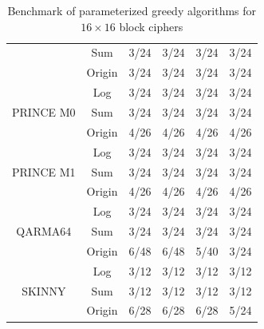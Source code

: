\begin{table}[H]
{\begin{tabular}{ c c c c c c }
             & Sum & 3/24 & 3/24 & 3/24 & 3/24 \\
             & Origin & 3/24 & 3/24 &  3/24 & 3/24 \\
             \hline
             \multirow{3}{4em}{PRINCE M0\cite{borghoff2012prince}} & Log &  3/24 & 3/24 & 3/24 & 3/24 \\
             & Sum & 3/24 & 3/24 & 3/24 & 3/24 \\
             & Origin & 4/26 & 4/26 & 4/26 & 4/26 \\
             \hline
             \multirow{3}{4em}{PRINCE M1\cite{borghoff2012prince}} & Log &  3/24 & 3/24 & 3/24 & 3/24 \\
             & Sum & 3/24 & 3/24 & 3/24 & 3/24 \\
             & Origin & 4/26 & 4/26 & 4/26 & 4/26 \\
            \hline
            \multirow{3}{4em}{QARMA64\cite{avanzi2017qarma}} & Log &  3/24 & 3/24 & 3/24 & 3/24 \\
             & Sum & 3/24 & 3/24 & 3/24 & 3/24 \\
             & Origin & 6/48 & 6/48 & 5/40 & 3/24 \\
            \hline
            \multirow{3}{4em}{SKINNY\cite{beierle2016skinny}} & Log &  3/12 & 3/12 & 3/12 & 3/12 \\
             & Sum & 3/12 & 3/12 & 3/12 & 3/12 \\
             & Origin & 6/28 & 6/28 & 6/28 & 5/24 \\
            \hline
        \end{tabular}}
        \caption{Benchmark of parameterized greedy algorithms for $16\times16$ block ciphers}
        \label{tab:greedy-algorithm-against-16-block}
        \end{table}


